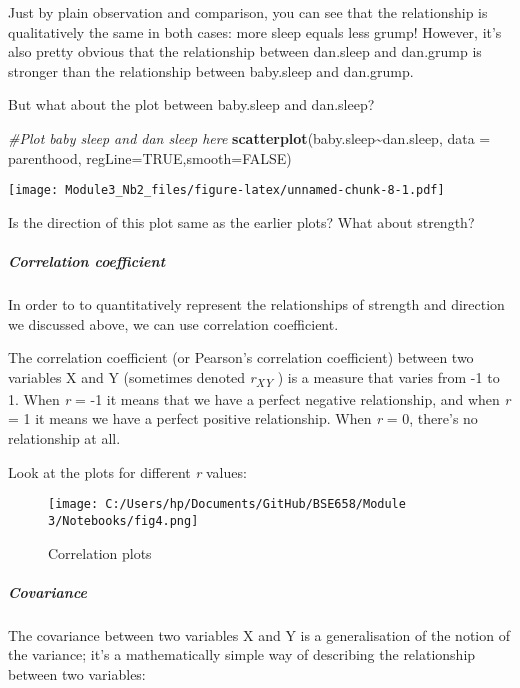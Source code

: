 \documentclass[
]{article}
\newenvironment{Shaded}{\begin{snugshade}}{\end{snugshade}}
\newcommand{\AttributeTok}[1]{\textcolor[rgb]{0.13,0.29,0.53}{#1}}
\newcommand{\CommentTok}[1]{\textcolor[rgb]{0.56,0.35,0.01}{\textit{#1}}}
\newcommand{\ConstantTok}[1]{\textcolor[rgb]{0.56,0.35,0.01}{#1}}
\newcommand{\FunctionTok}[1]{\textcolor[rgb]{0.13,0.29,0.53}{\textbf{#1}}}
\newcommand{\NormalTok}[1]{#1}
\newcommand{\SpecialCharTok}[1]{\textcolor[rgb]{0.81,0.36,0.00}{\textbf{#1}}}
\begin{document}
Just by plain observation and comparison, you can see that the
relationship is qualitatively the same in both cases: more sleep equals
less grump! However, it's also pretty obvious that the relationship
between dan.sleep and dan.grump is stronger than the relationship
between baby.sleep and dan.grump.

But what about the plot between baby.sleep and dan.sleep?

\begin{Shaded}
\begin{Highlighting}[]
\CommentTok{\#Plot baby sleep and dan sleep here}
\FunctionTok{scatterplot}\NormalTok{(baby.sleep}\SpecialCharTok{\textasciitilde{}}\NormalTok{dan.sleep, }\AttributeTok{data =}\NormalTok{ parenthood, }\AttributeTok{regLine=}\ConstantTok{TRUE}\NormalTok{,}\AttributeTok{smooth=}\ConstantTok{FALSE}\NormalTok{)}
\end{Highlighting}
\end{Shaded}

\texttt{[image: Module3\_Nb2\_files/figure-latex/unnamed-chunk-8-1.pdf]}

Is the direction of this plot same as the earlier plots? What about
strength?

\subparagraph{Correlation coefficient}\label{correlation-coefficient}

In order to to quantitatively represent the relationships of strength
and direction we discussed above, we can use correlation coefficient.

The correlation coefficient (or Pearson's correlation coefficient)
between two variables X and Y (sometimes denoted
\emph{r\textsubscript{XY}} ) is a measure that varies from -1 to 1. When
\emph{r} = -1 it means that we have a perfect negative relationship, and
when \emph{r} = 1 it means we have a perfect positive relationship. When
\emph{r} = 0, there's no relationship at all.

Look at the plots for different \emph{r} values:

\begin{figure}
\centering
\texttt{[image: C:/Users/hp/Documents/GitHub/BSE658/Module 3/Notebooks/fig4.png]}
\caption{Correlation plots}
\end{figure}

\subparagraph{Covariance}\label{covariance}

The covariance between two variables X and Y is a generalisation of the
notion of the variance; it's a mathematically simple way of describing
the relationship between two variables:
\end{document}

